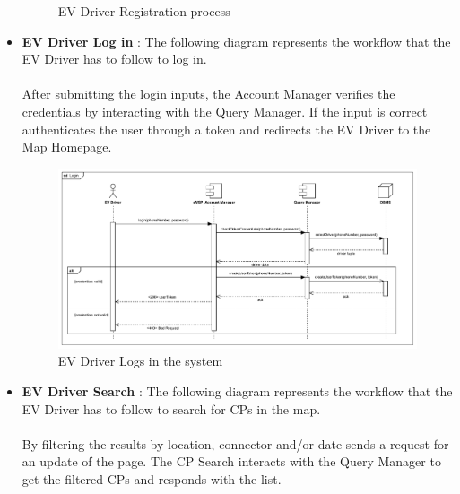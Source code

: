 \begin{itemize}
\begin{figure}[H]
              \caption{EV Driver Registration process}
          \end{figure}
          \pagebreak
    \item \textbf{EV Driver Log in} : The following diagram represents the workflow that the EV Driver has to follow to log in.\\
          \\After submitting the login inputs, the Account Manager verifies the credentials by interacting with the Query Manager. If
          the input is correct authenticates the user through a token and redirects the EV Driver to the Map Homepage.
          \begin{figure}[H]
              \centering
              \includegraphics[scale=0.55]{src/runtimeView/eMSP_Login.pdf}
              \caption{EV Driver Logs in the system}
          \end{figure}
    \item \textbf{EV Driver Search} : The following diagram represents the workflow that the EV Driver has to follow to search for CPs in the map.\\
          \\By filtering the results by location, connector and/or date sends a request for an update of the page. The CP Search
          interacts with the Query Manager to get the filtered CPs and responds with the list.


\end{itemize}
